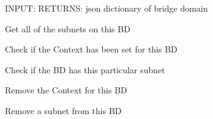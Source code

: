 \documentclass[letterpaper,10pt,english]{sphinxmanual}
\begin{document}
\begin{fulllineitems}
\begin{fulllineitems}
INPUT:
RETURNS: json dictionary of bridge domain

\end{fulllineitems}


\begin{fulllineitems}
\label{acitoolkit:acitoolkit.BridgeDomain.get_subnets}
Get all of the subnets on this BD

\end{fulllineitems}


\begin{fulllineitems}
\label{acitoolkit:acitoolkit.BridgeDomain.has_context}
Check if the Context has been set for this BD

\end{fulllineitems}


\begin{fulllineitems}
\label{acitoolkit:acitoolkit.BridgeDomain.has_subnet}
Check if the BD has this particular subnet

\end{fulllineitems}


\begin{fulllineitems}
\label{acitoolkit:acitoolkit.BridgeDomain.remove_context}
Remove the Context for this BD

\end{fulllineitems}


\begin{fulllineitems}
\label{acitoolkit:acitoolkit.BridgeDomain.remove_subnet}
Remove a subnet from this BD

\end{fulllineitems}


\end{fulllineitems}
\end{document}
